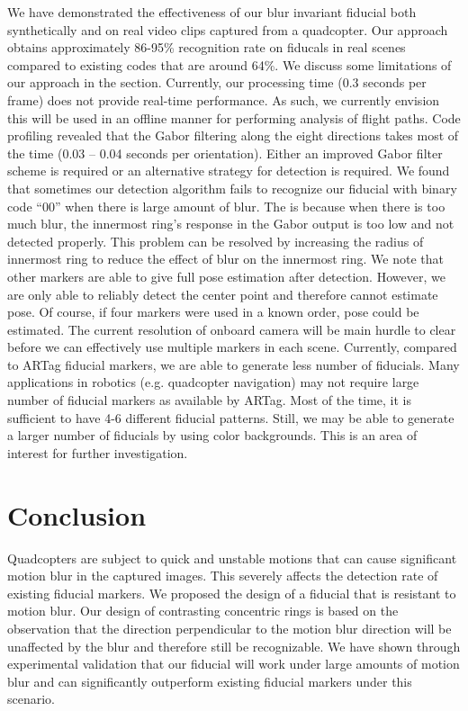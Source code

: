 \documentclass[10pt,twocolumn,letterpaper]{article}
\begin{document}
We have demonstrated the effectiveness of our blur invariant fiducial both
synthetically and on real video clips captured from a quadcopter.   Our approach obtains
approximately 86-95\% recognition rate on fiducals in real scenes compared to existing codes
that are around 64\%.  We discuss some limitations of our approach in the
section.
Currently, our processing time (0.3 seconds per frame) does not provide
real-time performance.  As such, we currently envision this will be used in an
offline manner for performing analysis of flight paths. Code profiling revealed
that the Gabor filtering along the eight directions takes most of the time
(0.03 -- 0.04 seconds per orientation).  Either an improved Gabor filter scheme
is required or an alternative strategy for detection is required.
We found that sometimes our detection
algorithm fails to recognize our fiducial with binary code ``00'' when there is
large amount of blur.  The is because when there is too much blur, the innermost
ring's response in the Gabor output is too low and not detected properly.
This problem can be resolved by increasing the radius of innermost ring to
reduce the effect of blur on the innermost ring. 
We note that other markers are able to give
full pose estimation after detection.  However, we are only able to reliably detect
the center point and therefore cannot estimate pose.  Of course, if four
markers were used in a known order, pose could be estimated. The current
resolution of onboard camera will be main hurdle to clear before we can
effectively use multiple markers in each scene.
Currently, compared to ARTag fiducial markers, we are able to generate less
number of fiducials. Many applications in robotics (e.g. quadcopter navigation)
may not require large number of fiducial markers as available by ARTag.  Most
of the time, it is sufficient to have 4-6 different fiducial patterns. Still,
we may be able to generate a larger number of fiducials by using color
backgrounds. This is an area of interest for further investigation.

\section{Conclusion}

Quadcopters are subject to quick and unstable motions that can cause significant
motion blur in the captured images. This severely affects the detection rate of
existing fiducial markers. We proposed the design of a fiducial that is
resistant to motion blur. Our design of contrasting concentric rings is based on the
observation that the direction perpendicular to the motion blur direction will
be unaffected by the blur and therefore still be recognizable. We have shown
through experimental validation that our fiducial will work under large
amounts of motion blur and can significantly outperform existing fiducial
markers under this scenario.

{\small


}
\end{document}
